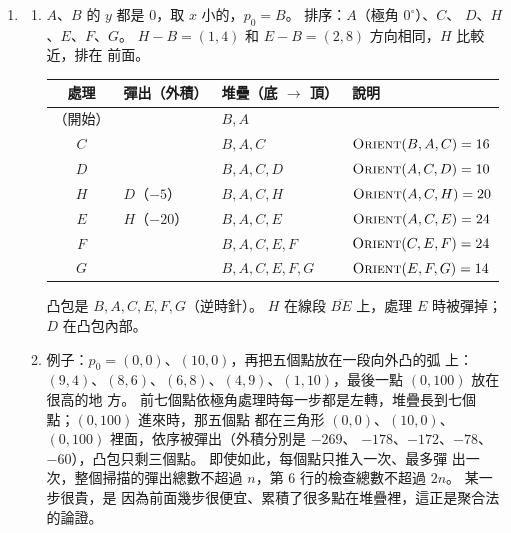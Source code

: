 \begin{enumerate}
\item
\begin{enumerate}
\item $A$、$B$ 的 $y$ 都是 $0$，取 $x$ 小的，$p_0 = B$。 排序：$A$（極角 $0^\circ$）、$C$、
$D$、$H$、$E$、$F$、$G$。 $H - B = (1, 4)$ 和 $E - B = (2, 8)$ 方向相同，$H$ 比較近，排在
前面。
\begin{center}
\begin{tabular}{clll}
\toprule
處理 & 彈出（外積） & 堆疊（底 $\to$ 頂） & 說明 \\
\midrule
（開始） & & $B, A$ & \\
$C$ & & $B, A, C$ & $\proc{Orient}(B, A, C) = 16$ \\
$D$ & & $B, A, C, D$ & $\proc{Orient}(A, C, D) = 10$ \\
$H$ & $D$（$-5$） & $B, A, C, H$ & $\proc{Orient}(A, C, H) = 20$ \\
$E$ & $H$（$-20$） & $B, A, C, E$ & $\proc{Orient}(A, C, E) = 24$ \\
$F$ & & $B, A, C, E, F$ & $\proc{Orient}(C, E, F) = 24$ \\
$G$ & & $B, A, C, E, F, G$ & $\proc{Orient}(E, F, G) = 14$ \\
\bottomrule
\end{tabular}
\end{center}
凸包是 $B, A, C, E, F, G$（逆時針）。 $H$ 在線段 $\overline{BE}$ 上，處理 $E$ 時被彈掉；
$D$ 在凸包內部。
\item 例子：$p_0 = (0, 0)$、$(10, 0)$，再把五個點放在一段向外凸的弧
上：$(9, 4)$、$(8, 6)$、$(6, 8)$、$(4, 9)$、$(1, 10)$，最後一點 $(0, 100)$ 放在很高的地
方。 前七個點依極角處理時每一步都是左轉，堆疊長到七個點；$(0, 100)$ 進來時，那五個點
都在三角形 $(0, 0)$、$(10, 0)$、$(0, 100)$ 裡面，依序被彈出（外積分別是 $-269$、
$-178$、$-172$、$-78$、$-60$），凸包只剩三個點。 即使如此，每個點只推入一次、最多彈
出一次，整個掃描的彈出總數不超過 $n$，第 6 行的檢查總數不超過 $2n$。 某一步很貴，是
因為前面幾步很便宜、累積了很多點在堆疊裡，這正是聚合法的論證。
\end{enumerate}


\end{enumerate}
